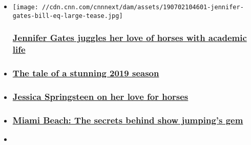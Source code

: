 \begin{itemize}
\item
  \href{/2019/07/17/sport/jennifer-gates-equestrian-philanthropy-gct-spt-intl/index.html}{}

  \texttt{[image: //cdn.cnn.com/cnnnext/dam/assets/190702104601-jennifer-gates-bill-eq-large-tease.jpg]}

  \hypertarget{jennifer-gates-juggles-her-love-of-horses-with-academic-life}{%
  \subsubsection{\texorpdfstring{\href{/2019/07/17/sport/jennifer-gates-equestrian-philanthropy-gct-spt-intl/index.html}{Jennifer
  Gates juggles her love of horses with academic
  life}}{Jennifer Gates juggles her love of horses with academic life}}\label{jennifer-gates-juggles-her-love-of-horses-with-academic-life}}
\item
  \hypertarget{the-tale-of-a-stunning-2019-season}{%
  \subsubsection{\texorpdfstring{\href{/2019/03/04/sport/global-champions-tour-2019-equestrian-spt-intl/index.html}{The
  tale of a stunning 2019
  season}}{The tale of a stunning 2019 season}}\label{the-tale-of-a-stunning-2019-season}}
\item
  \hypertarget{jessica-springsteen-on-her-love-for-horses}{%
  \subsubsection{\texorpdfstring{\href{/2019/05/14/sport/jessica-springsteen-bruce-equestrian-show-jumping-gct-miami-usa-spt-intl/index.html}{Jessica
  Springsteen on her love for
  horses}}{Jessica Springsteen on her love for horses}}\label{jessica-springsteen-on-her-love-for-horses}}
\item
  \hypertarget{miami-beach-the-secrets-behind-show-jumpings-gem}{%
  \subsubsection{\texorpdfstring{\href{/2019/04/26/sport/miami-beach-longines-champions-tour-stadium-time-lapse-spt-intl/index.html}{Miami
  Beach: The secrets behind show jumping's
  gem}}{Miami Beach: The secrets behind show jumping's gem}}\label{miami-beach-the-secrets-behind-show-jumpings-gem}}
\item
  \hypertarget{new-dad-ahlmann-clinches-paris-showjumping-victory}{%
}
\end{itemize}
